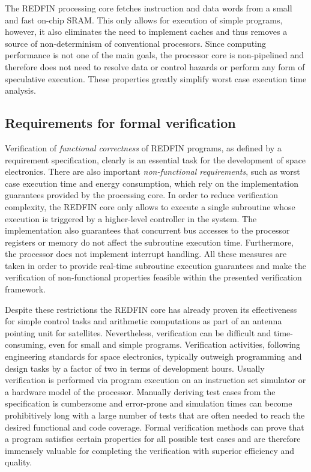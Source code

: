 The REDFIN processing core fetches instruction and data words from a small and fast
on-chip SRAM. This only allows for execution of simple programs, however, it also
eliminates the need to implement caches and thus removes a source of non-determinism of
conventional processors. Since computing performance is not one of the main goals, the
processor core is non-pipelined and therefore does not need to resolve data or control
hazards or perform any form of speculative execution. These properties greatly simplify
worst case execution time analysis.


\subsection{Requirements for formal verification}


Verification of \emph{functional correctness} of REDFIN programs, as defined by a
requirement specification, clearly is an essential task for the development of space
electronics. There are also important \emph{non-functional requirements}, such as
worst case execution time and energy consumption, which rely on the implementation
guarantees provided by the processing core. In order to reduce verification complexity,
the REDFIN core only allows to execute a single subroutine whose execution is triggered
by a higher-level controller in the system. The implementation also guarantees
that concurrent bus accesses to the processor registers or memory do not affect
the subroutine execution time. Furthermore, the processor does not implement
interrupt handling. All these measures are taken in order to provide real-time
subroutine execution guarantees and make the verification of non-functional
properties feasible within the presented verification framework.

Despite these restrictions the REDFIN core has already proven its effectiveness for
simple control tasks and arithmetic computations as part of an antenna pointing unit
for satellites. Nevertheless, verification can be difficult and time-consuming,
even for small and simple programs. Verification activities, following engineering
standards for space electronics, typically outweigh programming and design tasks by a
factor of two in terms of development hours. Usually verification is performed via
program execution on an instruction set simulator or a hardware model of the processor.
Manually deriving test cases from the specification is cumbersome and error-prone
and simulation times can become prohibitively long with a large number of tests that
are often needed to reach the desired functional and code coverage. Formal verification
methods can prove that a program satisfies certain properties for all possible
test cases and are therefore immensely valuable for completing the verification
with superior efficiency and quality.

